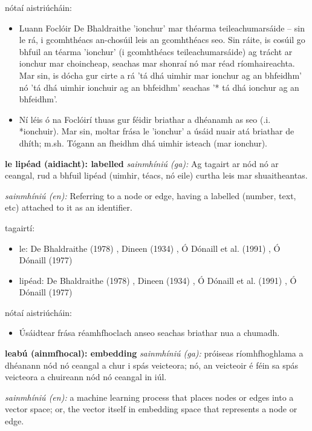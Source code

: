\documentclass{article}
\begin{document}
nótaí aistriúcháin:
\begin{itemize}
	\item Luann Foclóir De Bhaldraithe 'ionchur' mar théarma teileachumarsáide -- sin le rá, i gcomhthéacs an-chosúil leis an gcomhthéacs seo. Sin ráite, is cosúil go bhfuil an téarma 'ionchur' (i gcomhthéacs teileachumarsáide) ag trácht ar ionchur mar choincheap, seachas mar shonraí nó mar réad ríomhaireachta. Mar sin, is dócha gur cirte a rá 'tá dhá uimhir mar ionchur ag an bhfeidhm' nó 'tá dhá uimhir ionchuir ag an bhfeidhm' seachas '* tá dhá ionchur ag an bhfeidhm'.
	\item Ní léis ó na Foclóirí thuas gur féidir briathar a dhéanamh as seo (.i. *ionchuir). Mar sin, moltar frása le 'ionchur' a úsáid nuair atá briathar de dhíth; m.sh. Tógann an fheidhm dhá uimhir isteach (mar ionchur).
\end{itemize}


\textbf{le lipéad (aidiacht): labelled}
\textit{sainmhíniú (ga):} Ag tagairt ar nód nó ar ceangal, rud a bhfuil lipéad (uimhir, téacs, nó eile) curtha leis mar shuaitheantas.

\textit{sainmhíniú (en):} Referring to a node or edge, having a labelled (number, text, etc) attached to it as an identifier.

tagairtí:
\begin{itemize}
	\item le: De Bhaldraithe (1978) \cite{de-bhaldraithe}, Dineen (1934) \cite{dineen}, Ó Dónaill et al. (1991) \cite{focloir-beag}, Ó Dónaill (1977) \cite{odonaill}
	\item lipéad: De Bhaldraithe (1978) \cite{de-bhaldraithe}, Dineen (1934) \cite{dineen}, Ó Dónaill et al. (1991) \cite{focloir-beag}, Ó Dónaill (1977) \cite{odonaill}
\end{itemize}

nótaí aistriúcháin:
\begin{itemize}
	\item Úsáidtear frása réamhfhoclach anseo seachas briathar nua a chumadh.
\end{itemize}


\textbf{leabú (ainmfhocal): embedding}
\textit{sainmhíniú (ga):} próiseas ríomhfhoghlama a dhéanann nód nó ceangal a chur i spás veicteora; nó, an veicteoir é féin sa spás veicteora a chuireann nód nó ceangal in iúl.

\textit{sainmhíniú (en):} a machine learning process that places nodes or edges into a vector space; or, the vector itself in embedding space that represents a node or edge.
\end{document}
